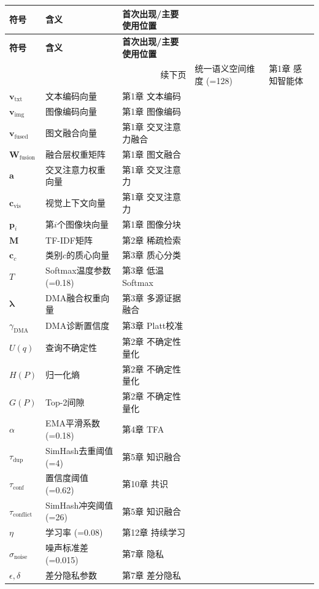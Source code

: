 \documentclass[11pt,a4paper]{ctexart}
\begin{document}
\small
\begin{longtable}{p{2cm}p{3.5cm}p{8.5cm}}
\toprule
\textbf{符号} & \textbf{含义} & \textbf{首次出现/主要使用位置} \\
\midrule
\endfirsthead
\midrule
\textbf{符号} & \textbf{含义} & \textbf{首次出现/主要使用位置} \\
\midrule
\endhead
\midrule
\multicolumn{3}{r}{\small 续下页} \
\endfoot
\bottomrule
\endlastfoot

$d$ & 统一语义空间维度 (=128) & 第1章 感知智能体\\
$\mathbf{v}_{\text{txt}}$ & 文本编码向量 & 第1章 文本编码\\
$\mathbf{v}_{\text{img}}$ & 图像编码向量 & 第1章 图像编码\\
$\mathbf{v}_{\text{fused}}$ & 图文融合向量 & 第1章 交叉注意力融合\\
$\mathbf{W}_{\text{fusion}}$ & 融合层权重矩阵 & 第1章 图文融合\\
$\mathbf{a}$ & 交叉注意力权重向量 & 第1章 交叉注意力\\
$\mathbf{c}_{\text{vis}}$ & 视觉上下文向量 & 第1章 交叉注意力\\
$\mathbf{p}_i$ & 第$i$个图像块向量 & 第1章 图像分块\\
$\mathbf{M}$ & TF-IDF矩阵 & 第2章 稀疏检索\\
$\mathbf{c}_c$ & 类别$c$的质心向量 & 第3章 质心分类\\
$T$ & Softmax温度参数 (=0.18) & 第3章 低温Softmax\\
$\boldsymbol{\lambda}$ & DMA融合权重向量 & 第3章 多源证据融合\\
$\gamma_{\text{DMA}}$ & DMA诊断置信度 & 第3章 Platt校准\\
$U(q)$ & 查询不确定性 & 第2章 不确定性量化\\
$H(P)$ & 归一化熵 & 第2章 不确定性量化\\
$G(P)$ & Top-2间隙 & 第2章 不确定性量化\\
$\alpha$ & EMA平滑系数 (=0.18) & 第4章 TFA\\
$\tau_{\text{dup}}$ & SimHash去重阈值 (=4) & 第5章 知识融合\\
$\tau_{\text{conf}}$ & 置信度阈值 (=0.62) & 第10章 共识\\
$\tau_{\text{conflict}}$ & SimHash冲突阈值 (=26) & 第5章 知识融合\\
$\eta$ & 学习率 (=0.08) & 第12章 持续学习\\
$\sigma_{\text{noise}}$ & 噪声标准差 (=0.015) & 第7章 隐私\\
$\epsilon, \delta$ & 差分隐私参数 & 第7章 差分隐私\\

\end{longtable}
\end{document}
